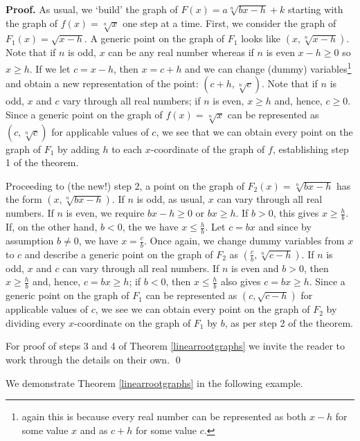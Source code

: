  {\bf Proof.}  As usual, we `build' the graph of $F(x) = a \sqrt[n]{bx-h}+k$ starting with the graph of $f(x) = \sqrt[n]{x}$ one step at a time.  First, we consider the graph of $F_{1}(x) = \sqrt{x-h}$.  A generic point on the graph of $F_{1}$ looks like $(x, \sqrt[n]{x-h})$.  Note that if $n$ is odd, $x$ can be any real number whereas if $n$ is even $x-h \geq 0$ so $x \geq h$.   If we let $c = x-h$, then $x = c+h$ and we can change (dummy) variables\footnote{again this is because every real number can be represented as both $x-h$ for some value $x$ and as $c+h$  for some value $c$.} and obtain a new representation of the point: $(c+h, \sqrt[n]{c})$.  Note that if $n$ is odd, $x$ and $c$ vary through all real numbers;  if $n$ is even, $x \geq h$ and, hence,  $c \geq 0$.  Since a generic point on the graph of $f(x) = \sqrt[n]{x}$ can be represented as $(c, \sqrt[n]{c})$ for applicable values of $c$, we see that we can obtain every point on the graph of $F_{1}$ by adding $h$ to each $x$-coordinate of the graph of $f$, establishing step 1 of the theorem.  
 
Proceeding to (the new!) step 2, a point on the graph of $F_{2}(x) = \sqrt[n]{bx-h}$ has the form $(x, \sqrt[n]{bx-h})$.  If $n$ is odd, as usual, $x$ can vary through all real numbers.  If $n$ is even, we require $bx-h \geq 0$ or $bx \geq h$.  If $b>0$, this gives $x \geq \frac{h}{b}$.  If, on the other hand, $b<0$, the we have $x \leq \frac{h}{b}$.   Let  $c = bx$ and since by assumption $b \neq 0$, we have $x = \frac{c}{b}$. Once again, we change dummy variables from $x$ to $c$ and describe a generic point on the graph of $F_{2}$ as $\left( \frac{c}{b}, \sqrt[n]{c - h} \right)$.  If $n$ is odd, $x$ and $c$ can vary through all real numbers.  If $n$ is even and $b>0$, then $x \geq \frac{h}{b}$ and, hence, $c = bx \geq h$;  if $b<0$, then $x \leq \frac{h}{b}$ also gives $c = bx \geq h$.  Since a generic point on the graph of $F_{1}$ can be represented as $(c, \sqrt{c-h})$ for applicable values of $c$, we see we can obtain every point on the graph of $F_{2}$ by dividing every $x$-coordinate on the graph of $F_{1}$ by $b$, as per step 2 of the theorem.

For proof of steps 3 and 4 of Theorem \ref{linearrootgraphs}  we invite the reader to work through the details on their own.  \qed

We  demonstrate Theorem \ref{linearrootgraphs} in the following example.

